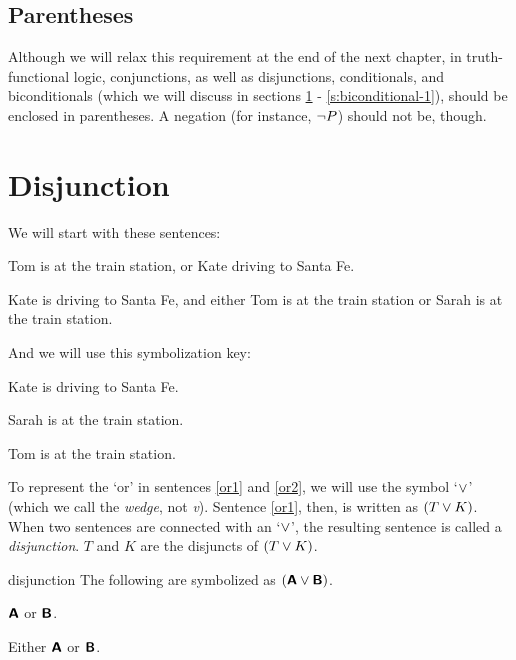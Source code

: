 \subsection{Parentheses}

Although we will relax this requirement at the end of the next chapter, in truth-functional logic, conjunctions, as well as disjunctions, conditionals, and biconditionals (which we will discuss in sections \ref{s:ConnectiveDisjunction} - \ref{s:biconditional-1}), should be enclosed in parentheses. A negation (for instance, ${\neg} P$) should not be, though. 



\section{Disjunction}
\label{s:ConnectiveDisjunction}

We will start with these sentences:
	\begin{earg}
		\item[\ex{or1}] Tom is at the train station, or Kate driving to Santa Fe.
		\item[\ex{or2}] Kate is driving to Santa Fe, and either Tom is at the train station or Sarah is at the train station. 
	\end{earg}
And we will use this symbolization key:
	\begin{ekey}
		\item[K] Kate is driving to Santa Fe.
		\item[S] Sarah is at the train station.
		\item[T] Tom is at the train station.
	\end{ekey}
To represent the `or' in sentences \ref{or1} and \ref{or2}, we will use the symbol `$\vee$' (which we call the \textit{wedge}, not \textit{v}). Sentence \ref{or1}, then, is written as $(T \vee K)$. When two sentences are connected with an `$\vee$', the resulting sentence is called a \textit{disjunction}. $T$ and $K$ are the {disjuncts} of $(T \vee K)$.


\begin{factboxy}{disjunction}
The following are symbolized as $(\bm{\mathsf{A}}\vee\bm{\mathsf{B}})$.
\vspace{-2mm}
\begin{earg}
\item[] $\bm{\mathsf{A}}$ or $\bm{\mathsf{B}}$.
\item[] Either $\bm{\mathsf{A}}$ or $\bm{\mathsf{B}}$.
\end{earg}
\end{factboxy}


